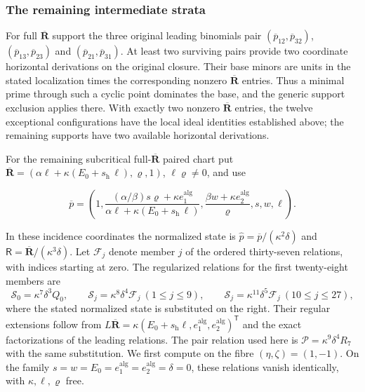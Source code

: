 \documentclass[11pt,a4paper]{article}
\numberwithin{equation}{section}
\theoremstyle{plain}
\theoremstyle{definition}
\theoremstyle{remark}
\begin{document}
\subsubsection{The remaining intermediate strata}\label{r3:full-supports}

For full $\overline{\boldsymbol R}$ support the three original leading binomials pair $(\overline p_{12},\overline p_{32})$, $(\overline p_{13},\overline p_{23})$ and $(\overline p_{21},\overline p_{31})$. At least two surviving pairs provide two coordinate horizontal derivations on the original closure. Their base minors are units in the stated localization times the corresponding nonzero $\overline{\boldsymbol R}$ entries. Thus a minimal prime through such a cyclic point dominates the base, and the generic support exclusion applies there.  With exactly two nonzero $\overline{\boldsymbol R}$ entries, the twelve exceptional configurations have the local ideal identities established above; the remaining supports have two available horizontal derivations.

For the remaining subcritical full-$\overline{\boldsymbol R}$ paired chart put $\overline{\boldsymbol R}=(\alpha\ell+\kappa(E_0+s_{\mathrm h}\,\ell),\varrho,1)$, $\ell\varrho\ne0$, and use

\begin{equation}\overline p=\left(1,\frac{(\alpha/\beta)s\varrho+\kappa e_1^{\mathrm{alg}}}{\alpha\ell+\kappa(E_0+s_{\mathrm h}\,\ell)},\frac{\beta w+\kappa e_2^{\mathrm{alg}}}{\varrho},s,w,\ell\right).\end{equation}

In these incidence coordinates the normalized state is
$\widehat p=\overline p/(\kappa^2\delta)$ and
$\mathsf R=\overline{\boldsymbol R}/(\kappa^3\delta)$.
Let $\mathscr F_j$ denote member $j$ of the ordered thirty-seven relations,
with indices starting at zero. The regularized
relations for the first twenty-eight members are
\[
 \mathcal S_0=\kappa^7\delta^3Q_0,\qquad
 \mathcal S_j=\kappa^8\delta^4\mathscr F_j\ (1\le j\le9),\qquad
 \mathcal S_j=\kappa^{11}\delta^5\mathscr F_j\ (10\le j\le27),
\]
where the stated normalized state is substituted on the right. Their
regular extensions follow from $L\overline{\boldsymbol R}
=\kappa(E_0+s_{\mathrm h}\ell,e_1^{\mathrm{alg}},e_2^{\mathrm{alg}})^{\mathsf T}$ and the exact
factorizations of the leading relations. The pair relation used here is
$\mathcal P=\kappa^9\delta^4R_7$ with the same substitution.
We first compute on the fibre $(\eta,\zeta)=(1,-1)$.
On the family $s=w=E_0=e_1^{\mathrm{alg}}=e_2^{\mathrm{alg}}=\delta=0$, these relations vanish identically,
with $\kappa,\ell,\varrho$ free.
\end{document}
